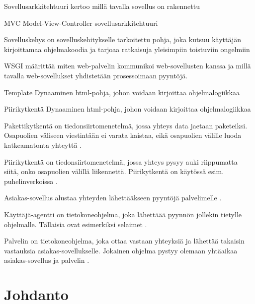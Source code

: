 \documentclass[utf8]{gradu3}
\begin{document}
\begin{thetermlist}
\item[Sovellusarkkitehtuuri] kertoo millä tavalla sovellus on rakennettu
\item[MVC] Model-View-Controller sovellusarkkitehtuuri
\item[Sovelluskehys] on sovelluskehitykselle tarkoitettu pohja, joka kutsuu käyttäjän kirjoittamaa ohjelmakoodia ja tarjoaa ratkaisuja yleisimpiin toistuviin ongelmiin
\item[WSGI] määrittää miten web-palvelin kommunikoi web-sovellusten kanssa ja millä tavalla web-sovellukset
yhdistetään prosessoimaan pyyntöjä.
\item[Template] Dynaaminen html-pohja, johon voidaan kirjoittaa ohjelmalogiikkaa
\item[Piirikytkentä] Dynaaminen html-pohja, johon voidaan kirjoittaa ohjelmalogiikkaa
\item[Pakettikytkentä] on tiedonsiirtomenetelmä, jossa yhteys data jaetaan paketeiksi. Osapuolien väliseen viestintään ei varata kaistaa, eikä osapuolien välille luoda katkeamatonta yhteyttä \parencite{kytkenta}.
\item[Piirikytkentä] on tiedonsiirtomenetelmä, jossa yhteys pysyy auki riippumatta siitä, onko osapuolien välillä liikennettä. Piirikytkentä on käytössä esim. puhelinverkoissa \parencite{kytkenta}.
\item[Asiakas-sovellus] alustaa yhteyden lähettääkseen pyyntöjä palvelimelle \cite{http}.
\item[Käyttäjä-agentti] on tietokoneohjelma, joka lähettäää pyynnön jollekin tietylle ohjelmalle. Tällaisia ovat esimerkiksi selaimet \cite{http}. 
\item[Palvelin] on tietokoneohjelma, joka ottaa vastaan yhteyksiä ja lähettää takaisin vastauksia asiakas-sovellukselle. Jokainen ohjelma pystyy olemaan yhtäaikaa asiakas-sovellus ja palvelin \cite{http}. 
\end{thetermlist}

\mainmatter

\chapter{Johdanto}
\end{document}
